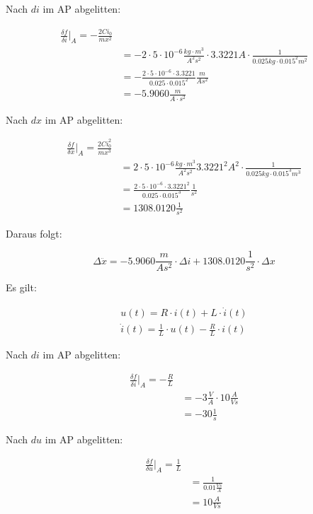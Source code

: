 \documentclass[a4paper,10pt,left=1.5cm,right=1.5cm,top=1.5cm,bottom=1.5cm]{article}
\begin{document}
Nach $di$ im AP abgelitten:

\begin{eqnarray*}
  \frac{\delta f}{\delta i} \bigg\vert_A = - \frac{2 C i_0}{mx^2} \\
& = - 2 \cdot 5 \cdot 10^{-6} \frac{kg \cdot m^3}{A^2 s^2} \cdot 3.3221 A \cdot \frac{1}{0.025 kg \cdot 0.015^2 m^2} \\
& = - \frac{2 \cdot 5 \cdot 10^{-6} \cdot 3.3221}{0.025 \cdot 0.015^2} \frac{m}{A s^2}\\
& = -5.9060 \frac{m}{A \cdot s^2}
\end{eqnarray*}

Nach $dx$ im AP abgelitten:

\begin{eqnarray*}
 \frac{\delta f}{\delta x} \bigg\vert_A = \frac{2 C i_0^2}{m x^3} \\
& = 2 \cdot 5 \cdot 10^{-6} \frac{kg \cdot m^3}{A^2 s^2} 3.3221^2 A^2 \cdot \frac{1}{0.025 kg \cdot 0.015^3 m^3} \\
& = \frac{2 \cdot 5 \cdot 10^{-6} \cdot 3.3221^2}{0.025 \cdot 0.015^3} \frac{1}{s^2} \\
& = 1308.0120 \frac{1}{s^2}
\end{eqnarray*}

Daraus folgt:

\begin{equation}
  \Delta \ddot{x} = - 5.9060 \frac{m}{A s^2} \cdot \Delta i + 1308.0120 \frac{1}{s^2} \cdot \Delta x
\end{equation}

Es gilt:

\begin{eqnarray*}
  u(t) = R \cdot i(t) + L \cdot \dot{i}(t) \\
  \dot{i}(t) = \frac{1}{L} \cdot u(t) - \frac{R}{L} \cdot i(t)
\end{eqnarray*}

Nach $di$ im AP abgelitten:

\begin{eqnarray*}
  \frac{\delta f}{\delta i} \bigg\vert_A = - \frac{R}{L} \\
& = - 3 \frac{V}{A} \cdot 10 \frac{A}{Vs} \\
& = - 30 \frac{1}{s}
\end{eqnarray*}

Nach $du$ im AP abgelitten:

\begin{eqnarray*}
  \frac{\delta f}{\delta u} \bigg\vert_A = \frac{1}{L} \\
& = \frac{1}{0.01 \frac{Vs}{A}} \\
& = 10 \frac{A}{Vs}
\end{eqnarray*}
\end{document}

